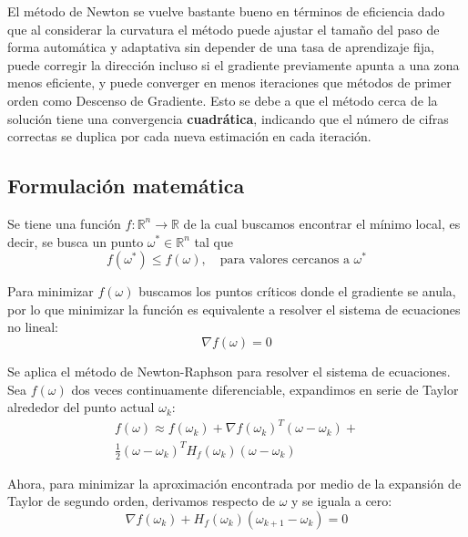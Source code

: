 \documentclass[conference]{IEEEtran}
\begin{document}
El método de Newton se vuelve bastante bueno en términos de eficiencia dado que al considerar la curvatura el método puede ajustar el tamaño del paso de forma automática y adaptativa sin depender de una tasa de aprendizaje fija, puede corregir la dirección incluso si el gradiente previamente apunta a una zona menos eficiente, y puede converger en menos iteraciones que métodos de primer orden como Descenso de Gradiente. Esto se debe a que el método cerca de la solución tiene una convergencia \textbf{cuadrática}, indicando que el número de cifras correctas se duplica por cada nueva estimación en cada iteración.

\subsection{Formulación matemática}
Se tiene una función \( f:\mathbb{R}^n\to\mathbb{R} \) de la cual buscamos encontrar el mínimo local, es decir, se busca un punto \( \omega^*\in\mathbb{R}^n \) tal que
\begin{equation}
f(\omega^{*})\leq f(\omega),\quad \text{para valores cercanos a } \omega^{*}
\label{eq:minimo_local}
\end{equation}

Para minimizar \( f(\omega) \) buscamos los puntos críticos donde el gradiente se anula, por lo que minimizar la función es equivalente a resolver el sistema de ecuaciones no lineal:
\begin{equation}
\nabla f(\omega)=0
\label{eq:gradiente_cero}
\end{equation}

Se aplica el método de Newton-Raphson para resolver el sistema de ecuaciones. Sea \( f(\omega) \) dos veces continuamente diferenciable, expandimos en serie de Taylor alrededor del punto actual \( \omega_k \):
\begin{multline}
f(\omega)\approx f(\omega_k)+\nabla f(\omega_k)^T(\omega-\omega_k)+ \\
\frac{1}{2}(\omega-\omega_k)^T H_f(\omega_k)(\omega-\omega_k)
\label{eq:taylor_segundo_orden}
\end{multline}

Ahora, para minimizar la aproximación encontrada por medio de la expansión de Taylor de segundo orden, derivamos respecto de \( \omega \) y se iguala a cero:
\begin{equation}
\nabla f(\omega_k)+H_f(\omega_k)(\omega_{k+1}-\omega_k)=0
\label{eq:gradiente_aproximado}
\end{equation}
\end{document}
